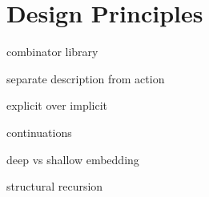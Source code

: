 \section{Design Principles}


combinator library

separate description from action

explicit over implicit

continuations

deep vs shallow embedding

structural recursion
